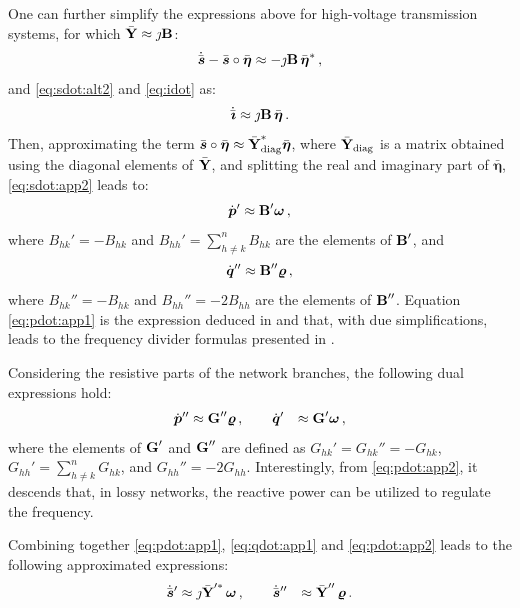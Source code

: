 \documentclass[journal, twocolumn, letter]{IEEEtran}
\newcommand{\bfg}[1]{\boldsymbol{#1}}
\newcommand{\bfb}[1]{\boldsymbol{\rm #1}}
\newcommand{\Bhk}{B_{hk}}
\newcommand{\Bhh}{B_{hh}}
\newcommand{\Ghk}{G_{hk}}
\newcommand{\Ghh}{G_{hh}}
\newcommand{\shnk}{{\textstyle \sum}_{h \ne k}^{n}}
\newcommand{\ii}{\imath}
\newcommand{\jj}{\jmath}
\newcommand{\idot}{\dot{\bar{\bfg \ii}}}
\newcommand{\svec}{\bar{\bfg s}}
\newcommand{\sdot}{\dot{\bar{\bfg s}}}
\newcommand{\evec}{\bar{\bfg \eta}}
\newcommand{\pdot}{\dot{\bfg p}}
\newcommand{\qdot}{\dot{\bfg q}}
\newcommand{\rhovec}{\bfg \varrho}
\newcommand{\wvec}{\bfg \omega}
\newcommand{\Bbus}{\bfb B}
\newcommand{\Gbus}{\bfb G}
\newcommand{\Ybus}{\bar{\bfb Y}}
\begin{document}
One can further simplify the expressions above for high-voltage
transmission systems, for which $\Ybus \approx \jj \Bbus$:
\begin{equation}
  \label{eq:sdot:app2}
  \sdot - \svec \circ \evec \approx - \jj \Bbus \, \evec^* \, ,
\end{equation}
and \eqref{eq:sdot:alt2} and \eqref{eq:idot} as:
\begin{equation}
  \label{eq:idot:app2}
  \idot \approx \jj \Bbus \, \evec \, .
\end{equation}
Then, approximating the term
$\svec \circ \evec \approx \bar{\bfb Y}^*_{\rm diag} \evec$, where
$\bar{\bfb Y}_{\rm diag}$ is a matrix obtained using the diagonal
elements of $\Ybus$, and splitting the real and imaginary part of
$\evec$, \eqref{eq:sdot:app2} leads to:
\begin{equation}
  \label{eq:pdot:app1}
  \pdot' \approx \Bbus' \wvec \, ,
\end{equation}
where $\Bhk' = - \Bhk$ and $\Bhh' = \shnk \Bhk$ are the elements of
$\Bbus'$,
and
\begin{equation}
  \label{eq:qdot:app1}
  \qdot'' \approx \Bbus'' \rhovec \, ,
\end{equation}
where $\Bhk'' = - \Bhk$ and $\Bhh'' = - 2 \Bhh$ are the elements of
$\Bbus''$.
Equation \eqref{eq:pdot:app1} is the expression deduced in
\cite{Maker1} and that, with due simplifications, leads to the
frequency divider formulas presented in \cite{Divider}.



Considering the resistive parts of the network branches, the following
dual expressions hold:
\begin{equation}
  \label{eq:pdot:app2}
  \begin{aligned}
    \pdot'' &\approx \Gbus'' \rhovec \, , \quad \quad
    \qdot' &\approx \Gbus' \wvec \, ,
  \end{aligned}
\end{equation}
where the elements of $\Gbus'$ and $\Gbus''$ are defined as
$\Ghk' = \Ghk'' = - \Ghk$, $\Ghh' = \shnk \Ghk$, and
$\Ghh'' = -2 \Ghh$.
Interestingly, from \eqref{eq:pdot:app2}, it descends that, in lossy
networks, the reactive power can be utilized to regulate the
frequency.

Combining together \eqref{eq:pdot:app1}, \eqref{eq:qdot:app1} and
\eqref{eq:pdot:app2} leads to the following approximated expressions:
\begin{equation}
  \label{eq:s1}
  \begin{aligned}
    \sdot' &\approx \jj \Ybus'^* \, \wvec \, , \quad \quad
    \sdot'' &\approx \Ybus'' \, \rhovec \, .
  \end{aligned}
\end{equation}
\end{document}
